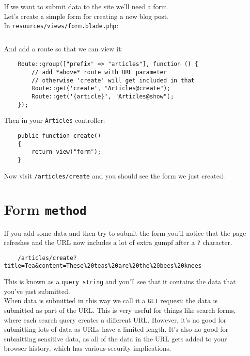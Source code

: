 If we want to submit data to the site we'll need a form.
\\

Let's create a simple form for creating a new blog post.
\\

In \texttt{resources/views/form.blade.php}:

\inputminted{php}{09-forms/figures/01-form.blade.php}

And add a route so that we can view it:

\begin{verbatim}
    Route::group(["prefix" => "articles"], function () {
        // add *above* route with URL parameter
        // otherwise 'create' will get included in that
        Route::get('create', "Articles@create");
        Route::get('{article}', "Articles@show");
    });
\end{verbatim}

Then in your \texttt{Articles} controller:

\begin{verbatim}
    public function create()
    {
        return view("form");
    }
\end{verbatim}

Now visit \texttt{/articles/create} and you should see the form we just created.

\section{Form \texttt{method}}

If you add some data and then try to submit the form you'll notice that the page refreshes and the URL now includes a lot of extra gumpf after a \texttt{?} character.

\begin{verbatim}
    /articles/create?title=Tea&content=These%20teas%20are%20the%20bees%20knees
\end{verbatim}

This is known as a \texttt{query string} and you'll see that it contains the data that you've just submitted.
\\

When data is submitted in this way we call it a \texttt{GET} request: the data is submitted as part of the URL. This is very useful for things like search forms, where each search query creates a different URL. However, it's no good for submitting lots of data as URLs have a limited length. It's also no good for submitting sensitive data, as all of the data in the URL gets added to your browser history, which has various security implications.
\\

